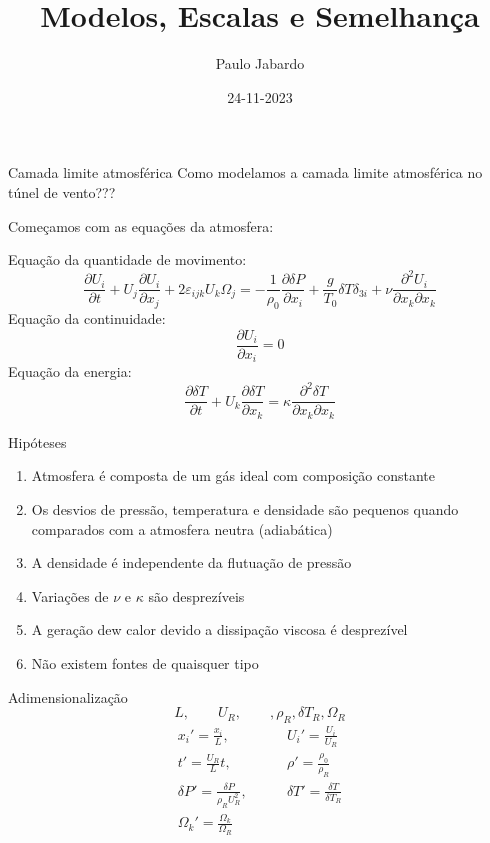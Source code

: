 \documentclass{beamer}
\title{Modelos, Escalas e Semelhança}
\author{Paulo Jabardo}
\date{24-11-2023}
\begin{document}
\maketitle
\begin{frame}{Camada limite atmosférica}
  Como modelamos a camada limite atmosférica no túnel de vento???

  Começamos com as equações da atmosfera:

  Equação da quantidade de movimento:
  \[
  \frac{\partial U_i}{\partial t} + U_j\frac{\partial U_i}{\partial x_j} + 2\varepsilon_{ijk} U_k\Omega_j = -\frac{1}{\rho_0}\frac{\partial \delta P}{\partial x_i} + \frac{g}{T_0}\delta T \delta_{3i} + \nu \frac{\partial^2 U_i}{\partial x_k \partial x_k}
  \]
  Equação da continuidade:
  \[
  \frac{\partial U_i}{\partial x_i} = 0
  \]
  Equação da energia:
  \[
  \frac{\partial\delta T}{\partial t} + U_k \frac{\partial\delta T}{\partial x_k} = \kappa \frac{\partial^2\delta T}{\partial x_k \partial x_k}
  \]
    
\end{frame}

\begin{frame}{Hipóteses}
  \begin{enumerate}
  \item Atmosfera é composta de um gás ideal com composição constante
  \item Os desvios de pressão, temperatura e densidade são pequenos quando comparados com a atmosfera neutra (adiabática)
  \item A densidade é independente da flutuação de pressão
  \item Variações de $\nu$ e $\kappa$ são desprezíveis
  \item A geração dew calor devido a dissipação viscosa é desprezível
  \item Não existem fontes de quaisquer tipo
  \end{enumerate}
\end{frame}
\begin{frame}{Adimensionalização}
  \[ L, \qquad U_R, \qquad, \rho_R, \delta T_R, \Omega_R\]
  \[
  \begin{aligned}
    x_i' = \frac{x_i}{L}, \qquad &U_i' = \frac{U_i}{U_R} \\
    t' = \frac{U_R}{L}t, \qquad &\rho' = \frac{\rho_0}{\rho_R} \\
    \delta P' = \frac{\delta P}{\rho_R U_R^2}, \qquad & \delta T' = \frac{\delta T}{\delta T_R} \\
    \Omega_k' = \frac{\Omega_k}{\Omega_R} \qquad & \\
  \end{aligned}
  \]
  
      
\end{frame}
\end{document}
